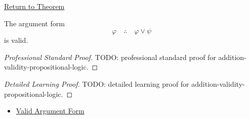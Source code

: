 \newpage
{}
\label{prf:addition-validity-propositional-logic}

\begin{remark*}[Return]
\hyperref[thm:addition-validity-propositional-logic]{Return to Theorem}
\end{remark*}

\begin{theorem*}
The argument form
\[
\varphi \quad\therefore\quad \varphi\lor\psi
\]
is valid.
\end{theorem*}

\begin{proof}[Professional Standard Proof]
\LRAProofBodyStart
TODO: professional standard proof for addition-validity-propositional-logic.
\end{proof}

\begin{proof}[Detailed Learning Proof]
\LRAProofBodyStart
TODO: detailed learning proof for addition-validity-propositional-logic.
\end{proof}

\begin{remark*}
\end{remark*}

\begin{dependencies}
\begin{itemize}
  \item \hyperref[def:valid-argument-form-propositional-logic]{Valid Argument Form}
\end{itemize}
\end{dependencies}

\clearpage

